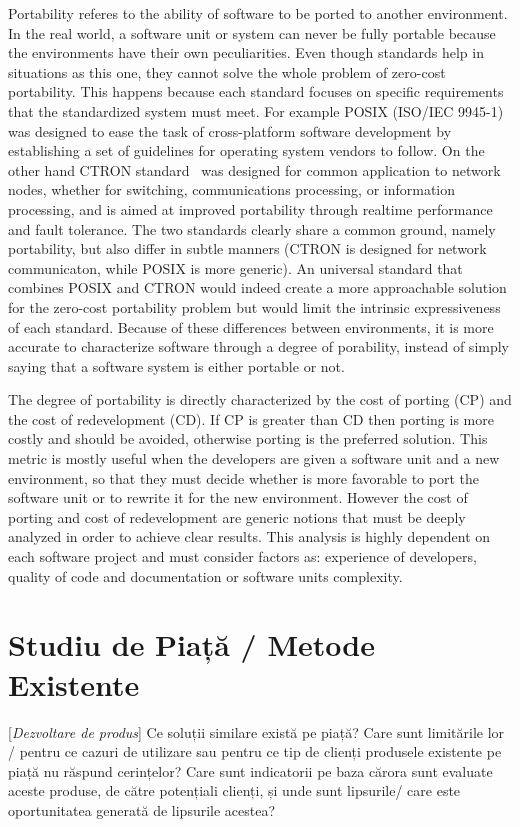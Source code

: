 \documentclass[12pt,a4paper]{report}
\newcommand{\worktype}[1]{[\textit{#1}] }
\newcommand{\dezvoltare}{\worktype{Dezvoltare de produs}}
\begin{document}
Portability referes to the ability of software to be ported to another
environment. In the real world, a software unit or system can never be fully portable because the
environments have their own peculiarities. Even though standards help in situations as this one,
they cannot solve the whole problem of zero-cost portability. This happens because each standard
focuses on specific requirements that the standardized system must meet. For example POSIX
(ISO/IEC 9945-1) was designed to ease the task of cross-platform software development by
establishing a set of guidelines for operating system vendors to follow. On the other hand CTRON
standard~\cite{wasano1989application} was designed for common application to network nodes, whether
for switching, communications
processing, or information processing, and is aimed at improved portability through realtime
performance and fault tolerance. The two standards clearly share a common ground, namely portability,
but also differ in subtle manners (CTRON is designed for network communicaton, while POSIX is more
generic). An universal standard that combines POSIX and CTRON would indeed create a more approachable
solution for the zero-cost portability problem but would limit the intrinsic expressiveness of
each standard. Because of these differences between environments, it is more accurate to characterize
software through a degree of porability, instead of simply saying that a software system is either
portable or not.

The degree of portability is directly characterized by the cost of porting (CP) and the cost of
redevelopment (CD). If CP is greater than CD then porting is more costly and should be avoided,
otherwise porting is the preferred solution. This metric is mostly useful when the developers are
given a software unit and a new environment, so that they must decide whether is more favorable
to port the software unit or to rewrite it for the new environment. However the cost of porting
and cost of redevelopment are generic notions that must be deeply analyzed in order to achieve
clear results. This analysis is highly dependent on each software project and must consider
factors as: experience of developers, quality of code and documentation or software units
complexity.

\chapter{Studiu de Piață / Metode Existente}
\dezvoltare Ce soluții similare există pe piață? Care sunt limitările lor / pentru ce cazuri de utilizare sau pentru ce tip de clienți produsele existente pe piață nu răspund cerințelor? Care sunt indicatorii pe baza cărora sunt evaluate aceste produse, de către potențiali clienți, și unde sunt lipsurile/ care este oportunitatea generată de lipsurile acestea?
\end{document}
